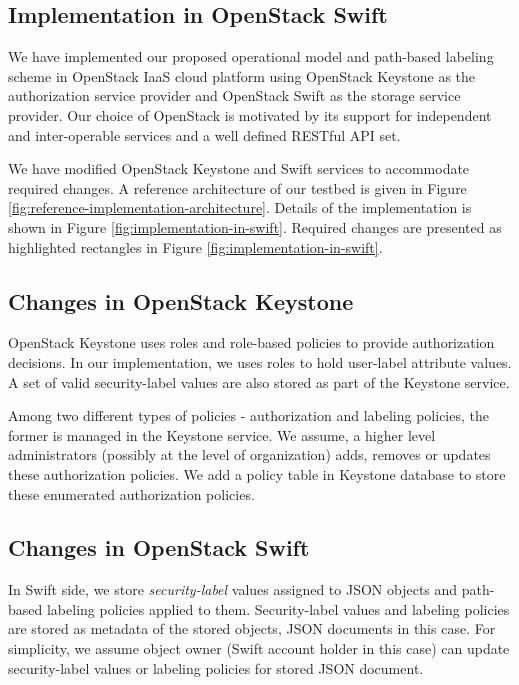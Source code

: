 


\subsection { Implementation in OpenStack Swift}
\label{sec:implementation}





We have implemented our proposed operational model and path-based labeling scheme in OpenStack IaaS cloud platform using OpenStack Keystone as the authorization service provider and OpenStack Swift as the storage service provider. Our choice of OpenStack is motivated by its support for independent and inter-operable  services and a well defined RESTful API set.

We have modified OpenStack Keystone and Swift services to accommodate required changes. A reference architecture of our testbed is given in Figure \ref{fig:reference-implementation-architecture}. Details of the implementation is shown in Figure \ref{fig:implementation-in-swift}. Required changes are presented as highlighted rectangles in Figure \ref{fig:implementation-in-swift}.

\subsection{Changes in OpenStack Keystone}

 OpenStack Keystone uses roles and role-based policies to provide authorization decisions. In our implementation, we uses roles to hold user-label attribute values. A set of valid security-label values are also stored as part of the Keystone service.
 
 Among two different types of policies - authorization and labeling policies, the former is managed in the Keystone service. We assume, a higher level administrators (possibly at the level of organization) adds, removes or updates these authorization policies. We add a policy table in Keystone database to store these enumerated authorization policies. 

\subsection{Changes in OpenStack Swift}

In Swift side, we store \textit{security-label} values assigned to JSON objects and path-based labeling policies applied to them.  Security-label values and labeling policies are stored as metadata of the stored objects, JSON documents in this case. For simplicity, we assume object owner (Swift account holder in this case) can update security-label values or labeling policies for stored JSON document. 


